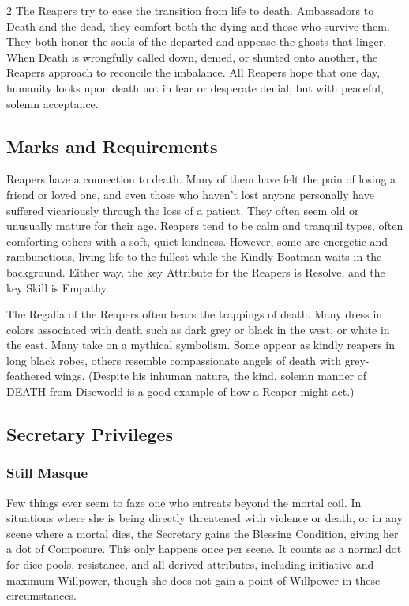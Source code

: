 \begin{multicols}{2}
The Reapers try to ease the transition from life to death. Ambassadors to Death and the dead, they comfort both the dying and those who survive them. They both honor the souls of the departed and appease the ghosts that linger. When Death is wrongfully called down, denied, or shunted onto another, the Reapers approach to reconcile the imbalance. All Reapers hope that one day, humanity looks upon death not in fear or desperate denial, but with peaceful, solemn acceptance. 

\subsection*{Marks and Requirements}

Reapers have a connection to death. Many of them have felt the pain of losing a friend or loved one, and even those who haven’t lost anyone personally have suffered vicariously through the loss of a patient. They often seem old or unusually mature for their age. Reapers tend to be calm and tranquil types, often comforting others with a soft, quiet kindness. However, some are energetic and rambunctious, living life to the fullest while the Kindly Boatman waits in the background. Either way, the key Attribute for the Reapers is Resolve, and the key Skill is Empathy.

The Regalia of the Reapers often bears the trappings of death. Many dress in colors associated with death such as dark grey or black in the west, or white in the east. Many take on a mythical symbolism. Some appear as kindly reapers in long black robes, others resemble compassionate angels of death with grey-feathered wings. (Despite his inhuman nature, the kind, solemn manner of DEATH from Discworld is a good example of how a Reaper might act.) 

\subsection*{Secretary Privileges}

\subsubsection*{Still Masque}

Few things ever seem to faze one who entreats beyond the mortal coil. In situations where she is being directly threatened with violence or death, or in any scene where a mortal dies, the Secretary gains the Blessing Condition, giving her a dot of Composure. This only happens once per scene. It counts as a normal dot for dice pools, resistance, and all derived attributes, including initiative and maximum Willpower, though she does not gain a point of Willpower in these circumstances.


\end{multicols}
